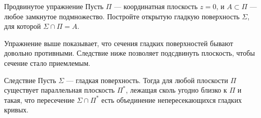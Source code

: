 \begin{thm}{Продвинутое упражнение}\label{ex:plane-section}
Пусть $\Pi$ --- координатная плоскость $z=0$, и $A \subset \Pi$ --- любое замкнутое подмножество.
Постройте открытую гладкую поверхность $\Sigma$, для которой $\Sigma \cap \Pi = A$.
\end{thm}

Упражнение выше показывает, что сечения гладких поверхностей бывают довольно противными.
Следствие ниже позволяет подсдвинуть плоскость, чтобы сечение стало приемлемым.

\begin{thm}{Следствие}
Пусть $\Sigma$ --- гладкая поверхность.
Тогда для любой плоскости $\Pi$ существует параллельная плоскость $\Pi^{*}$, лежащая сколь угодно близко к $\Pi$ и такая, что пересечение $\Sigma\cap\Pi^{*}$ есть объединение непересекающихся гладких кривых.
\end{thm}

